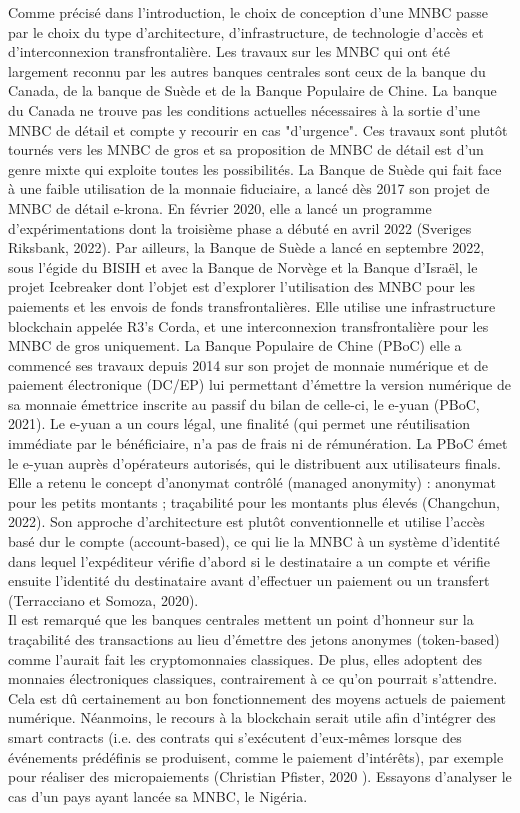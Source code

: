 \documentclass[12pt]{article}
\begin{document}
Comme précisé dans l'introduction, le choix de conception d'une MNBC passe par le choix du type d'architecture, d'infrastructure, de technologie d'accès et d'interconnexion transfrontalière. Les travaux sur les MNBC qui ont été largement reconnu par les autres banques centrales sont ceux de la banque du Canada, de la banque de Suède et de la Banque Populaire de Chine. La banque du Canada ne trouve pas les conditions actuelles nécessaires à la sortie d'une MNBC de détail et compte y recourir en cas "d'urgence". Ces travaux sont plutôt tournés vers les MNBC de gros et sa proposition de MNBC de détail est d'un genre mixte qui exploite toutes les possibilités. La Banque de Suède qui fait face à une faible utilisation de la monnaie fiduciaire, a lancé dès 2017 son projet de MNBC de détail e-krona. En février 2020, elle a lancé un programme d’expérimentations dont la troisième phase a débuté en avril 2022 (Sveriges Riksbank, 2022). Par ailleurs, la Banque de Suède a lancé en septembre 2022, sous l’égide du BISIH et avec la Banque de Norvège et la Banque d’Israël, le projet Icebreaker dont l’objet est d’explorer l’utilisation des MNBC pour les paiements et les envois de fonds transfrontalières. Elle utilise une infrastructure blockchain appelée R3's Corda, et une interconnexion transfrontalière pour les MNBC de gros uniquement. La Banque Populaire de Chine (PBoC) elle a commencé ses travaux depuis 2014 sur son projet de monnaie numérique et de paiement électronique (DC/EP) lui permettant d'émettre la version numérique de sa monnaie émettrice inscrite au passif du bilan de celle-ci, le e-yuan (PBoC, 2021). Le e-yuan a un cours légal, une finalité (qui permet une réutilisation immédiate par le bénéficiaire, n'a pas de frais ni de rémunération. La PBoC émet le e-yuan auprès d’opérateurs autorisés, qui le distribuent aux utilisateurs finals. Elle a retenu le concept d’anonymat contrôlé (managed anonymity) : anonymat pour les petits montants ; traçabilité pour les montants plus élevés (Changchun, 2022). Son approche d'architecture est plutôt conventionnelle et utilise l'accès basé dur le compte (account-based), ce qui lie la MNBC à un système d'identité dans lequel l'expéditeur vérifie d'abord si le destinataire a un compte et vérifie ensuite l'identité du destinataire avant d'effectuer un paiement ou un transfert (Terracciano et Somoza, 2020). \\

Il est remarqué que les banques centrales mettent un point d'honneur sur la traçabilité des transactions au lieu d'émettre des jetons anonymes (token-based) comme l'aurait fait les cryptomonnaies classiques.  De plus, elles adoptent des monnaies électroniques classiques, contrairement à ce qu'on pourrait s'attendre. Cela est dû certainement au bon fonctionnement des moyens actuels de paiement numérique. Néanmoins, le recours à la blockchain serait utile afin d’intégrer des smart contracts (i.e. des contrats qui s’exécutent d’eux‐mêmes lorsque des événements prédéfinis se produisent, comme le paiement d’intérêts), par exemple pour réaliser des micropaiements (Christian Pfister, 2020 \cite{RePEc:bfr:bullbf:2020:230:01}). Essayons d'analyser le cas d'un pays ayant lancée sa MNBC, le Nigéria.\\
\end{document}
